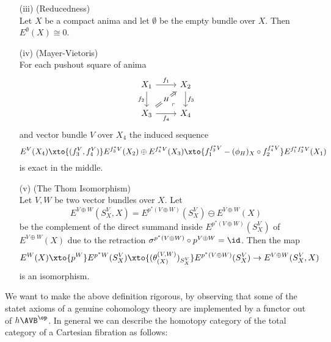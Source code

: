 \begin{definition}
\begin{enumerate}
    \item[(iii)]\label{reduced} (Reducedness)\\
      Let $X$ be a compact anima and 
      let $\emptyset$ be the empty bundle over $X$. Then 
      $E^\emptyset(X) \cong 0$.
    \item[(iv)]\label{mayervietoris} (Mayer-Vietoris)\\
    For each pushout square of anima
    \[\begin{tikzcd}
      {X_1} & {X_2} \\
      {X_3} & {X_4}
      \arrow["{f_1}", from=1-1, to=1-2]
      \arrow["{f_3}", from=1-2, to=2-2]
      \arrow["{f_2}"', from=1-1, to=2-1]
      \arrow["{f_4}"', from=2-1, to=2-2]
      \arrow["\lrcorner"{anchor=center, pos=0.125, rotate=180}, draw=none, from=2-2, to=1-1]
      \arrow["H"{description}, Rightarrow, from=2-1, to=1-2]
    \end{tikzcd}\]
    and vector bundle $V$ over $X_4$ the induced sequence
    \[
      E^{V}(X_4) \xto{(f_3^V,f_4^V)} E^{f_3^*V}(X_2)\oplus E^{f_4^*V}(X_3)
      \xto{f_1^{f_3^*V} - ({\phi_H})_X \circ f_2^{f_4^*V}} E^{f_1^*f_3^*V}(X_1)
      \]
    is exact in the middle.
    \item[(v)]\label{thomiso}(The Thom Isomorphism)\\
    Let $V,W$ be two vector bundles over $X$. Let
    \[E^{V\oplus W}(S_X^V,X) =
    E^{p^*(V\oplus W)}(S_X^V) \ominus E^{V\oplus W}(X)
    \] be the complement of
    the direct summand inside $E^{p^*(V\oplus W)}(S_X^{V})$ of $E^{V\oplus W}(X)$
    due to the retraction $\sigma^{p^*(V\oplus W)} \circ p^{V\oplus W} = \id$.
    Then the map
    \[
    E^W(X) \xto{p^W} E^{p^*W}(S_X^V) \xto{(\theta_{(X)}^{(V,W)})_{S_X^V}} E^{p^*(V \oplus W)}(S_X^V) \to E^{V\oplus W}(S_X^V,X)
    \]
    is an isomorphism.
  \end{enumerate}
  
  \end{definition}
  
  We want to make the above definition rigorous, by observing that some of the statet 
  axioms of a genuine cohomology theory are implemented by a functor 
  out of $h\AVB^\op$. In general we can describe the homotopy category of the 
  total category of a Cartesian fibration as follows:
  
